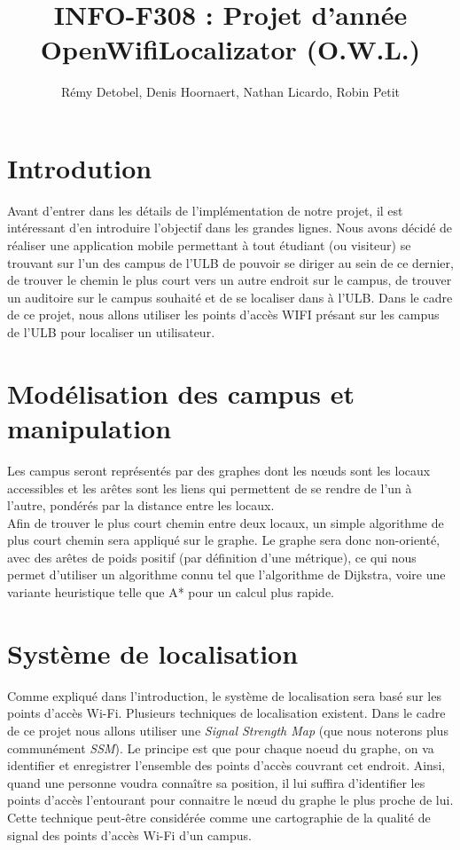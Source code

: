 \documentclass[a4paper,11pt]{article}
\title{INFO-F308 : Projet d'année \\ OpenWifiLocalizator (O.W.L.)}
\author{Rémy Detobel, Denis Hoornaert, Nathan Licardo, Robin Petit}
\begin{document}
\maketitle

\section{Introdution}
	Avant d'entrer dans les détails de l'implémentation de notre projet, il est intéressant d'en introduire l'objectif dans les grandes lignes.
	Nous avons décidé de réaliser une application mobile permettant à tout étudiant (ou visiteur) se trouvant sur l'un des campus de l'ULB de pouvoir se diriger au sein de ce dernier, de trouver le chemin le plus court vers un autre endroit sur le campus, de trouver un auditoire sur le campus souhaité et de se localiser dans à l'ULB.
	Dans le cadre de ce projet, nous allons utiliser les points d'accès WIFI présant sur les campus de l'ULB pour localiser un utilisateur.

\section{Modélisation des campus et manipulation}
	Les campus seront représentés par des graphes dont les nœuds sont les locaux accessibles et les arêtes sont les liens qui permettent de se rendre de l'un à l'autre, pondérés par la distance entre les locaux.\\
	Afin de trouver le plus court chemin entre deux locaux, un simple algorithme de plus court chemin sera appliqué sur le graphe. Le graphe sera donc non-orienté, avec des arêtes de poids positif (par définition d'une métrique), ce qui nous permet d'utiliser un algorithme connu tel que l'algorithme de Dijkstra, voire une variante heuristique telle que A* pour un calcul plus rapide.

\section{Système de localisation}
	Comme expliqué dans l'introduction, le système de localisation sera basé sur les points d'accès Wi-Fi. Plusieurs techniques de localisation existent. Dans le cadre de ce projet nous allons utiliser une \textit{Signal Strength Map} (que nous noterons plus communément \textit{SSM}). Le principe est que pour chaque noeud du graphe, on va identifier et enregistrer l'ensemble des points d'accès couvrant cet endroit.
	Ainsi, quand une personne voudra connaître sa position, il lui suffira d'identifier les points d'accès l'entourant pour connaitre le nœud du graphe le plus proche de lui.
	Cette technique peut-être considérée comme une cartographie de la qualité de signal des points d'accès Wi-Fi d'un campus.
\end{document}
